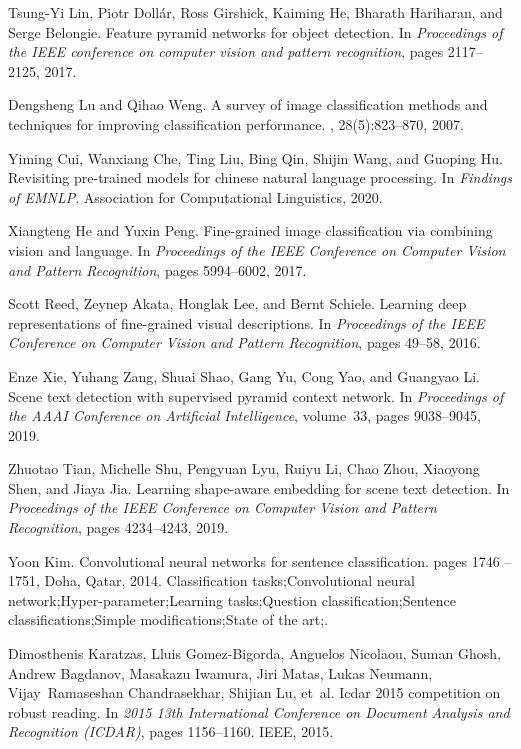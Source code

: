 \documentclass[10pt,twocolumn,letterpaper]{article}
\begin{document}
{\begin{thebibliography}{10}
Tsung-Yi Lin, Piotr Doll{\'a}r, Ross Girshick, Kaiming He, Bharath Hariharan,
  and Serge Belongie.
\newblock Feature pyramid networks for object detection.
\newblock In {\em Proceedings of the IEEE conference on computer vision and
  pattern recognition}, pages 2117--2125, 2017.



Dengsheng Lu and Qihao Weng.
\newblock A survey of image classification methods and techniques for improving
  classification performance.
, 28(5):823--870, 2007.


Yiming Cui, Wanxiang Che, Ting Liu, Bing Qin, Shijin Wang, and Guoping Hu.
\newblock Revisiting pre-trained models for chinese natural language
  processing.
\newblock In {\em Findings of EMNLP}. Association for Computational
  Linguistics, 2020.


Xiangteng He and Yuxin Peng.
\newblock Fine-grained image classification via combining vision and language.
\newblock In {\em Proceedings of the IEEE Conference on Computer Vision and
  Pattern Recognition}, pages 5994--6002, 2017.



Scott Reed, Zeynep Akata, Honglak Lee, and Bernt Schiele.
\newblock Learning deep representations of fine-grained visual descriptions.
\newblock In {\em Proceedings of the IEEE Conference on Computer Vision and
  Pattern Recognition}, pages 49--58, 2016.


Enze Xie, Yuhang Zang, Shuai Shao, Gang Yu, Cong Yao, and Guangyao Li.
\newblock Scene text detection with supervised pyramid context network.
\newblock In {\em Proceedings of the AAAI Conference on Artificial
  Intelligence}, volume~33, pages 9038--9045, 2019.




Zhuotao Tian, Michelle Shu, Pengyuan Lyu, Ruiyu Li, Chao Zhou, Xiaoyong Shen,
  and Jiaya Jia.
\newblock Learning shape-aware embedding for scene text detection.
\newblock In {\em Proceedings of the IEEE Conference on Computer Vision and
  Pattern Recognition}, pages 4234--4243, 2019.

Yoon Kim.
\newblock Convolutional neural networks for sentence classification.
\newblock pages 1746 -- 1751, Doha, Qatar, 2014.
\newblock Classification tasks;Convolutional neural
  network;Hyper-parameter;Learning tasks;Question classification;Sentence
  classifications;Simple modifications;State of the art;.


Dimosthenis Karatzas, Lluis Gomez-Bigorda, Anguelos Nicolaou, Suman Ghosh,
  Andrew Bagdanov, Masakazu Iwamura, Jiri Matas, Lukas Neumann,
  Vijay~Ramaseshan Chandrasekhar, Shijian Lu, et~al.
\newblock Icdar 2015 competition on robust reading.
\newblock In {\em 2015 13th International Conference on Document Analysis and
  Recognition (ICDAR)}, pages 1156--1160. IEEE, 2015.


\end{thebibliography}

}
\end{document}
